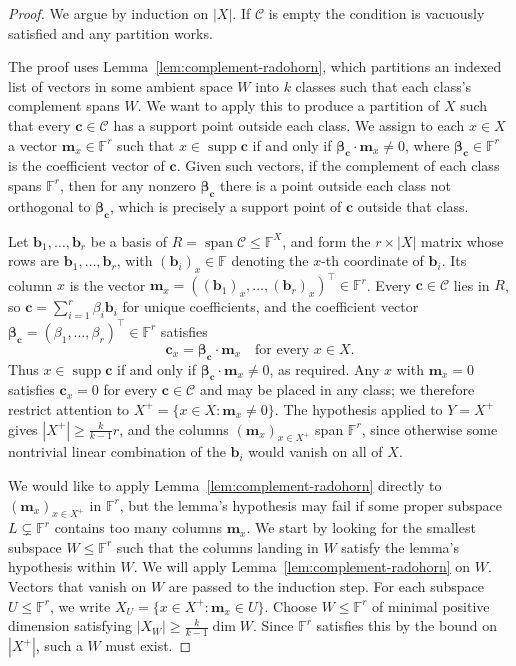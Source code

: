 \documentclass[11pt]{amsart}
\newcommand{\F}{\mathbb{F}}
\DeclareMathOperator{\Span}{span}
\begin{document}
\begin{proof}
We argue by induction on $|X|$. If $\mathcal C$ is empty the condition is
vacuously satisfied and any partition works.

The proof uses Lemma~\ref{lem:complement-radohorn}, which partitions an indexed list
of vectors in some ambient space $W$ into $k$ classes such that each class's
complement spans $W$. We want to apply this to produce a partition of $X$ such
that every $\mathbf{c} \in \mathcal C$ has a support point outside each
class. We assign to each $x \in X$ a vector $\mathbf{m}_x \in \F^r$
such that $x \in \operatorname{supp} \mathbf{c}$ if and only if
$\boldsymbol{\beta}_{\mathbf{c}} \cdot \mathbf{m}_x \neq 0$, where
$\boldsymbol{\beta}_{\mathbf{c}} \in \F^r$ is the coefficient vector of
$\mathbf{c}$. Given such vectors, if the complement of each class spans $\F^r$,
then for any nonzero $\boldsymbol{\beta}_{\mathbf{c}}$ there is a point outside
each class not orthogonal to $\boldsymbol{\beta}_{\mathbf{c}}$, which is
precisely a support point of $\mathbf{c}$ outside that class.

Let $\mathbf{b}_1, \ldots, \mathbf{b}_r$ be a basis of $R = \Span\mathcal C
\leq \F^X$, and form the $r \times |X|$ matrix whose rows are
$\mathbf{b}_1, \ldots, \mathbf{b}_r$, with $(\mathbf{b}_i)_x \in \F$ denoting
the $x$-th coordinate of $\mathbf{b}_i$. Its column $x$ is the vector
$\mathbf{m}_x = ((\mathbf{b}_1)_x, \ldots, (\mathbf{b}_r)_x)^\top \in \F^r$. Every
$\mathbf{c} \in \mathcal C$ lies in $R$, so $\mathbf{c} = \sum_{i=1}^r
\beta_i \mathbf{b}_i$ for unique coefficients, and the coefficient vector
$\boldsymbol{\beta}_{\mathbf{c}} = (\beta_1, \ldots, \beta_r)^\top \in \F^r$
satisfies
$$
        \mathbf{c}_x = \boldsymbol{\beta}_{\mathbf{c}} \cdot \mathbf{m}_x
        \quad \text{for every } x \in X.
$$
Thus $x \in \operatorname{supp} \mathbf{c}$ if and only if
$\boldsymbol{\beta}_{\mathbf{c}} \cdot \mathbf{m}_x \neq 0$, as required.
Any $x$ with $\mathbf{m}_x = 0$ satisfies $\mathbf{c}_x = 0$ for every
$\mathbf{c} \in \mathcal C$ and may be placed in any class; we therefore
restrict attention to $X^+ = \{x \in X : \mathbf{m}_x \neq 0\}$. The
hypothesis applied to $Y = X^+$ gives $|X^+| \geq \frac{k}{k-1}r$, and the
columns $(\mathbf{m}_x)_{x \in X^+}$ span $\F^r$, since otherwise some
nontrivial linear combination of the $\mathbf{b}_i$ would vanish on all of $X$.

We would like to apply Lemma~\ref{lem:complement-radohorn} directly to
$(\mathbf{m}_x)_{x \in X^+}$ in $\F^r$, but the lemma's hypothesis may fail
if some proper subspace $L \subsetneq \F^r$ contains too many
columns $\mathbf{m}_x$. We start by looking for the smallest subspace $W \leq \F^r$ such that the
columns landing in $W$ satisfy the lemma's hypothesis within $W$. We will apply
Lemma~\ref{lem:complement-radohorn} on $W$. Vectors that vanish on $W$ are passed to the
induction step. For each subspace $U \leq \F^r$, we write $X_U = \{x \in X^+ :
\mathbf{m}_x \in U\}$.
Choose $W \leq \F^r$ of minimal positive dimension satisfying $|X_W| \geq
\frac{k}{k-1}\dim W$. Since $\F^r$ satisfies this by the bound on
$|X^+|$, such a $W$ must exist.


\end{proof}
\end{document}
